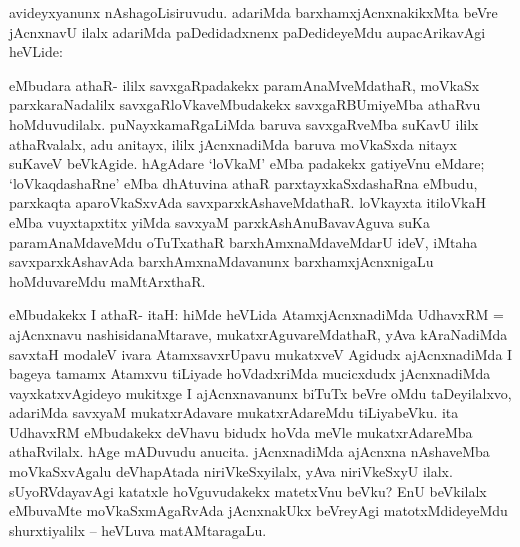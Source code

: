 \begin{artha}
avideyxyanunx nAshagoLisiruvudu. adariMda barxhamxjAcnxnakikxMta beVre jAcnxnavU ilalx adariMda paDedidadxnenx paDedideyeMdu aupacArikavAgi heVLide:
\end{artha}


\begin{artha}
eMbudara athaR- ililx savxgaRpadakekx paramAnaMveMdathaR, moVkaSx parxkaraNadalilx savxgaRloVkaveMbudakekx savxgaRBUmiyeMba athaRvu hoMduvudilalx. puNayxkamaRgaLiMda baruva savxgaRveMba suKavU ililx athaRvalalx, adu anitayx, ililx jAcnxnadiMda baruva moVkaSxda nitayx suKaveV beVkAgide. hAgAdare `loVkaM' eMba padakekx gatiyeVnu eMdare; `loVkaqdashaRne' eMba dhAtuvina athaR parxtayxkaSxdashaRna eMbudu, parxkaqta aparoVkaSxvAda savxparxkAshaveMdathaR. loVkayxta itiloVkaH eMba vuyxtapxtitx yiMda savxyaM parxkAshAnuBavavAguva suKa paramAnaMdaveMdu oTuTxathaR barxhAmxnaMdaveMdarU ideV, iMtaha savxparxkAshavAda barxhAmxnaMdavanunx barxhamxjAcnxnigaLu hoMduvareMdu maMtArxthaR. 
\end{artha}


\begin{artha}
eMbudakekx I athaR- itaH: hiMde heVLida AtamxjAcnxnadiMda UdhavxRM = ajAcnxnavu nashisidanaMtarave, mukatxrAguvareMdathaR, yAva kAraNadiMda savxtaH modaleV ivara AtamxsavxrUpavu mukatxveV Agidudx ajAcnxnadiMda I bageya tamamx Atamxvu tiLiyade hoVdadxriMda mucicxdudx jAcnxnadiMda vayxkatxvAgideyo mukitxge I ajAcnxnavanunx biTuTx beVre oMdu taDeyilalxvo, adariMda savxyaM mukatxrAdavare mukatxrAdareMdu tiLiyabeVku. ita UdhavxRM eMbudakekx deVhavu bidudx hoVda meVle mukatxrAdareMba athaRvilalx. hAge mADuvudu anucita. jAcnxnadiMda ajAcnxna nAshaveMba moVkaSxvAgalu deVhapAtada niriVkeSxyilalx, yAva niriVkeSxyU ilalx. sUyoRVdayavAgi katatxle hoVguvudakekx matetxVnu beVku? EnU beVkilalx eMbuvaMte moVkaSxmAgaRvAda jAcnxnakUkx beVreyAgi matotxMdideyeMdu shurxtiyalilx {\rm --} heVLuva matAMtaragaLu.
\end{artha}



